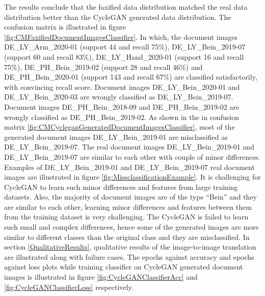 The results conclude that the faxified data distribution matched the real data distribution better than the \ac{CycleGAN} generated data distribution. The confusion matrix is illustrated in figure \ref{fig:CMFaxifiedDocumentImagesClassifier}. In which, the document images DE\_LY\_Arm\_2020-01 (support 44 and recall 75\%), DE\_LY\_Bein\_2019-07 (support 60 and recall 83\%), DE\_LY\_Hand\_2020-01 (support 16 and recall 75\%), DE\_PH\_Bein\_2019-02 (support 28 and recall 46\%) and DE\_PH\_Bein\_2020-01 (support 143 and recall 67\%) are classified satisfactorily, with convincing recall score. Document images DE\_LY\_Bein\_2020-01 and DE\_LY\_Bein\_2020-03 are wrongly classified as DE\_LY\_Bein\_2019-07. Document images DE\_PH\_Bein\_2018-09 and DE\_PH\_Bein\_2019-02 are wrongly classified as DE\_PH\_Bein\_2019-02. As shown in the in confusion matrix \ref{fig:CMCycleganGeneratedDocumentImagesClassifier}, most of the generated document images DE\_LY\_Bein\_2019-01 are misclassified as DE\_LY\_Bein\_2019-07. The real document images DE\_LY\_Bein\_2019-01 and DE\_LY\_Bein\_2019-07 are similar to each other with couple of minor differences. Examples of DE\_LY\_Bein\_2019-01 and DE\_LY\_Bein\_2019-07 real document images are illustrated in figure \ref{fig:MissclassificationExample}. It is challenging for \ac{CycleGAN} to learn such minor differences and features from large training datasets. Also, the majority of document images are of the type ``Bein'' and they are similar to each other, learning minor differences and features between them from the training dataset is very challenging. The \ac{CycleGAN} is failed to learn such small and complex differences, hence some of the generated images are more similar to different classes than the original class and they are misclassified. In section \ref{QualitativeResults}, qualitative results of the image-to-image translation are illustrated along with failure cases. The epochs against accuracy and epochs against loss plots while training classifier on \ac{CycleGAN} generated document images is illustrated in figure \ref{fig:CycleGANClassifierAcc} and \ref{fig:CycleGANClassifierLoss} respectively.

